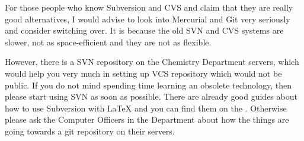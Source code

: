 \documentclass[
]{scrartcl}
\begin{document}
For those people who know Subversion and CVS and claim that they are really good
alternatives, I would advise to look into Mercurial and Git very seriously and
consider switching over.
%
It is because the old SVN and CVS systems are slower, not as space-efficient and
they are not as flexible.

However, there is a SVN repository on the Chemistry Department servers, which
would help you very much in setting up VCS repository which would not be public.
%
If you do not mind spending time learning an obsolete technology, then please
start using SVN as soon as possible.
%
There are already good guides about how to use Subversion with \LaTeX{} and you
can find them on the
.
%
Otherwise please ask the Computer Officers in the Department about how the
things are going towards a git repository on their servers.
\end{document}
